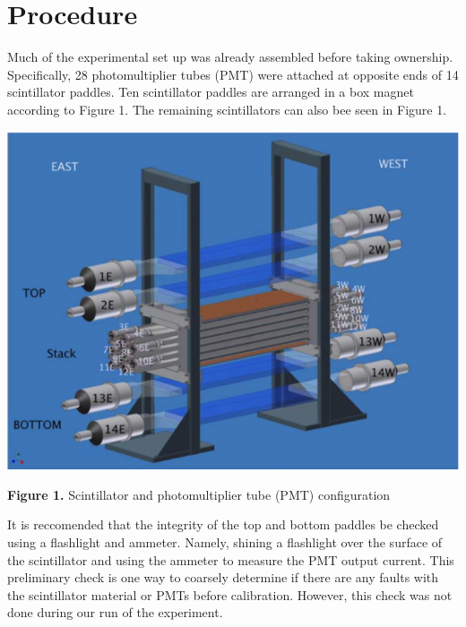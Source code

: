 \documentclass{article}
\begin{document}
 






 

\section*{Procedure}
\hspace{3.5mm} Much of the experimental set up was already assembled before taking ownership. Specifically, 28 photomultiplier tubes (PMT) were attached at opposite ends of 14 scintillator paddles. Ten scintillator paddles are arranged in a box magnet according to Figure 1. The remaining scintillators can also bee seen in Figure 1. 

\begin{center}

    \vspace{5mm}
    
    \includegraphics[width = \textwidth]{Figure1.png}   
    
    \vspace{5mm}
    
    \textbf{Figure 1.} Scintillator and photomultiplier tube (PMT) configuration
    
\end{center}

It is reccomended that the integrity of the top and bottom paddles be checked using a flashlight and ammeter. Namely, shining a flashlight over the surface of the scintillator and using the ammeter to measure the PMT output current. This preliminary check is one way to coarsely determine if there are any faults with the scintillator material or PMTs before calibration. However, this check was not done during our run of the experiment. 
\end{document}
